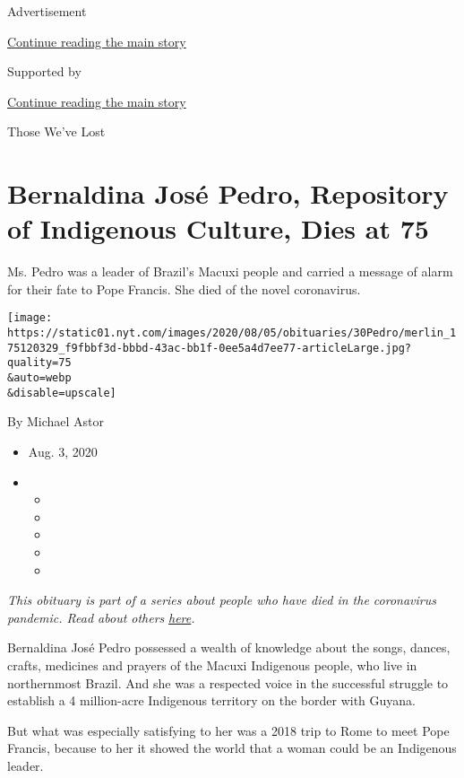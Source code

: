 Advertisement

\protect\hyperlink{after-top}{Continue reading the main story}

Supported by

\protect\hyperlink{after-sponsor}{Continue reading the main story}

Those We've Lost

\hypertarget{bernaldina-josuxe9-pedro-repository-of-indigenous-culture-dies-at-75}{%
\section{Bernaldina José Pedro, Repository of Indigenous Culture, Dies
at
75}\label{bernaldina-josuxe9-pedro-repository-of-indigenous-culture-dies-at-75}}

Ms. Pedro was a leader of Brazil's Macuxi people and carried a message
of alarm for their fate to Pope Francis. She died of the novel
coronavirus.

\texttt{[image: https://static01.nyt.com/images/2020/08/05/obituaries/30Pedro/merlin\_175120329\_f9fbbf3d-bbbd-43ac-bb1f-0ee5a4d7ee77-articleLarge.jpg?quality=75\\\&auto=webp\\\&disable=upscale]}

By Michael Astor

\begin{itemize}
\item
  Aug. 3, 2020
\item
  \begin{itemize}
  \item
  \item
  \item
  \item
  \item
  \end{itemize}
\end{itemize}

\emph{This obituary is part of a series about people who have died in
the coronavirus pandemic. Read about others}
\href{https://www.nytimes.com/interactive/2020/obituaries/people-died-coronavirus-obituaries.html}{\emph{here}}\emph{.}

Bernaldina José Pedro possessed a wealth of knowledge about the songs,
dances, crafts, medicines and prayers of the Macuxi Indigenous people,
who live in northernmost Brazil. And she was a respected voice in the
successful struggle to establish a 4 million-acre Indigenous territory
on the border with Guyana.

But what was especially satisfying to her was a 2018 trip to Rome to
meet Pope Francis, because to her it showed the world that a woman could
be an Indigenous leader.

